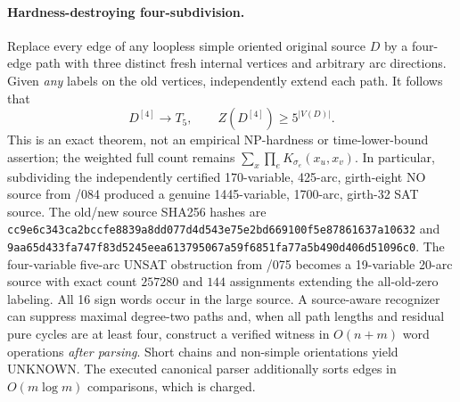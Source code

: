 \documentclass[11pt]{article}
\begin{document}
\paragraph{Hardness-destroying four-subdivision.}
Replace every edge of any loopless simple oriented original
source $D$ by a four-edge path with three distinct fresh
internal vertices and arbitrary arc directions. Given
\emph{any} labels on the old vertices, independently
extend each path. It follows that
\[
\boxed{D^{[4]}\longrightarrow T_5,\qquad
 Z(D^{[4]})\ge5^{|V(D)|}.}
\]
This is an exact theorem, not an empirical NP-hardness
or time-lower-bound assertion; the weighted full count
remains $\sum_x\prod_e K_{\sigma_e}(x_u,x_v)$.
In particular, subdividing the independently certified
170-variable, 425-arc, girth-eight NO source from /084
produced a genuine 1445-variable, 1700-arc, girth-32
SAT source. The old/new source SHA256 hashes are
\texttt{cc9e6c343ca2bccfe8839a8dd077d4d543e75e2bd669100f5e87861637a10632}
and
\texttt{9aa65d433fa747f83d5245eea613795067a59f6851fa77a5b490d406d51096c0}.
The four-variable five-arc UNSAT obstruction from /075
becomes a 19-variable 20-arc source with exact count
$257280$ and $144$ assignments extending the all-old-zero
labeling. All 16 sign words occur in the large source.
A source-aware recognizer can suppress maximal degree-two
paths and, when all path lengths and residual pure cycles
are at least four, construct a verified witness in
$O(n+m)$ word operations \emph{after parsing}. Short
chains and non-simple orientations yield UNKNOWN.
The executed canonical parser additionally sorts edges
in $O(m\log m)$ comparisons, which is charged.
\end{document}
